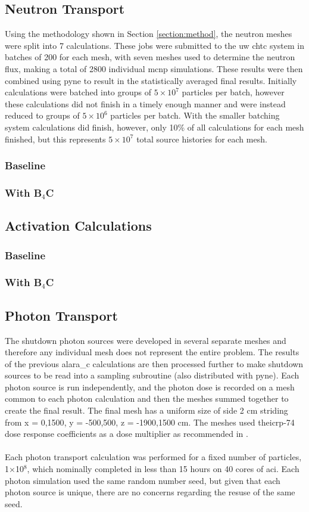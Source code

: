 \documentclass[12pt]{article}
\begin{document}
\subsection{Neutron Transport}
Using the methodology shown in Section \ref{section:method}, the neutron meshes
were split into 7 calculations. These jobs were submitted to the \gls{uw}
\gls{chtc} system in batches of 200 for each mesh, with seven meshes used to
determine the neutron flux, making a
total of 2800 individual \gls{mcnp} simulations. These results were then
combined using \gls{pyne} to result in the statistically averaged final results.
Initially calculations were batched into groups of $5\times10^7$ particles per
batch, however these calculations did not finish in a timely enough manner and
were instead reduced to groups of $5\times10^6$ particles per batch. With the
smaller batching system calculations did finish, however, only 10\% of all
calculations for each mesh finished, but this represents $5\times10^7$ total
source histories for each mesh.
\subsubsection{Baseline}
\subsubsection{With B$_4$C}
\subsection{Activation Calculations}
\subsubsection{Baseline}
\subsubsection{With B$_4$C}
\subsection{Photon Transport}
The shutdown photon sources were developed in several separate meshes and
therefore any individual mesh does not represent the entire problem. The
results of the previous \gls{alara_c} calculations are then processed further
to make shutdown sources to be read into a sampling subroutine (also distributed
with \gls{pyne}). Each photon source is run independently, and the photon dose
is recorded on a mesh common to each photon calculation and then the meshes
summed together to create the final result. The final mesh has a uniform size of
side 2 cm striding from x = {0,1500}, y = {-500,500}, z = {-1900,1500} cm.
The meshes used the\gls{icrp}-74 dose response coefficients as a dose multiplier
as recommended in \cite{iter_sdr_coeffs}.
\\
\\
Each photon transport calculation was performed for a fixed number of particles,
1$\times$10$^8$, which nominally completed in less than 15 hours on 40 cores of
\gls{aci}. Each photon simulation used the same random number seed, but given
that each photon source is unique, there are no concerns regarding the resuse
of the same seed.
\end{document}
